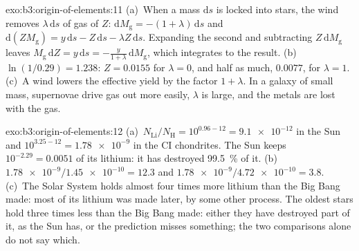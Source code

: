 \begin{solution}{exo:b3:origin-of-elements:11}
(a)~When a mass $\mathrm{d}s$ is locked into stars, the wind removes
$\lambda\,\mathrm{d}s$ of gas of  $Z$:
$\mathrm{d}M_\mathrm{g} = -(1 + \lambda)\,\mathrm{d}s$ and
$\mathrm{d}(ZM_\mathrm{g}) = y\,\mathrm{d}s - Z\,\mathrm{d}s -
\lambda Z\,\mathrm{d}s$. Expanding the second and subtracting
$Z\,\mathrm{d}M_\mathrm{g}$ leaves $M_\mathrm{g}\,\mathrm{d}Z =
y\,\mathrm{d}s = -\frac{y}{1 + \lambda}\,\mathrm{d}M_\mathrm{g}$, which
integrates to the result. (b)~$\ln(1/0.29) = 1.238$: $Z = 0.0155$ for
$\lambda = 0$, and half as much, $0.0077$, for $\lambda = 1$. (c)~A wind
lowers the effective yield by the factor $1 + \lambda$. In a galaxy of
small mass, supernovae drive gas out more easily, $\lambda$ is large,
and the metals are lost with the gas.
\end{solution}

\begin{solution}{exo:b3:origin-of-elements:12}
(a)~$N_\mathrm{Li}/N_\mathrm{H} = 10^{0.96 - 12} = \num{9.1e-12}$ in the
Sun and $10^{3.25 - 12} = \num{1.78e-9}$ in the CI chondrites. The Sun
keeps $10^{-2.29} = \num{0.0051}$ of its lithium: it has destroyed
\qty{99.5}{\percent} of it. (b)~$\num{1.78e-9}/\num{1.45e-10} = 12.3$ and
$\num{1.78e-9}/\num{4.72e-10} = 3.8$. (c)~The Solar System holds almost
four times more lithium than the Big Bang made: most of its lithium was
made later, by some other process. The oldest stars hold three times
less than the Big Bang made: either they have destroyed part of it, as
the Sun has, or the prediction misses something; the two comparisons
alone do not say which.
\end{solution}

